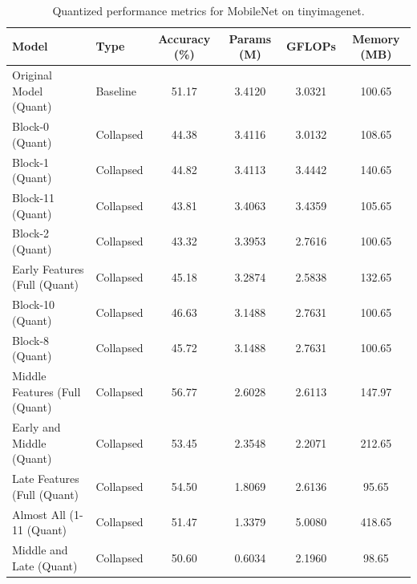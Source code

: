 \begin{table}
\caption{Quantized performance metrics for MobileNet on tinyimagenet.}
\label{tab:MobileNet_tinyimagenet_quant}
\begin{tabular}{llcccc}
\toprule
Model & Type & Accuracy (\%) & Params (M) & GFLOPs & Memory (MB) \\
\midrule
Original Model
(Quant) & Baseline & 51.17 & 3.4120 & 3.0321 & 100.65 \\
Block-0
(Quant) & Collapsed & 44.38 & 3.4116 & 3.0132 & 108.65 \\
Block-1
(Quant) & Collapsed & 44.82 & 3.4113 & 3.4442 & 140.65 \\
Block-11
(Quant) & Collapsed & 43.81 & 3.4063 & 3.4359 & 105.65 \\
Block-2
(Quant) & Collapsed & 43.32 & 3.3953 & 2.7616 & 100.65 \\
Early Features (Full
(Quant) & Collapsed & 45.18 & 3.2874 & 2.5838 & 132.65 \\
Block-10
(Quant) & Collapsed & 46.63 & 3.1488 & 2.7631 & 100.65 \\
Block-8
(Quant) & Collapsed & 45.72 & 3.1488 & 2.7631 & 100.65 \\
Middle Features (Full
(Quant) & Collapsed & 56.77 & 2.6028 & 2.6113 & 147.97 \\
Early and Middle
(Quant) & Collapsed & 53.45 & 2.3548 & 2.2071 & 212.65 \\
Late Features (Full
(Quant) & Collapsed & 54.50 & 1.8069 & 2.6136 & 95.65 \\
Almost All (1-11
(Quant) & Collapsed & 51.47 & 1.3379 & 5.0080 & 418.65 \\
Middle and Late
(Quant) & Collapsed & 50.60 & 0.6034 & 2.1960 & 98.65 \\
\bottomrule
\end{tabular}
\end{table}
